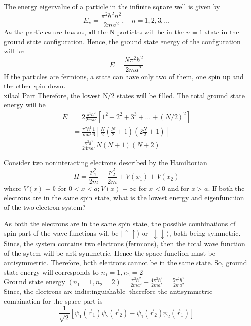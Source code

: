 \begin{answer}
	The energy eigenvalue of a particle in the infinite square well is given by
	$$
	E_{n}=\frac{\pi^{2} \hbar^{2} n^{2}}{2 m a^{2}}, \quad n=1,2,3, \ldots
	$$
	As the particles are bosons, all the $\mathrm{N}$ particles will be in the $n=1$ state in the ground state configuration. Hence, the ground state energy of the configuration will be
	$$
	E=\frac{N \pi^{2} \hbar^{2}}{2 m a^{2}}
	$$
	If the particles are fermions, a state can have only two of them, one spin up and the other spin down.\\
	xilaal Part Therefore, the lowest $\mathrm{N} / 2$ states will be filled. The total ground state energy will be
	$$
	\begin{aligned}
	E &=2 \frac{\pi^{2} \hbar^{2}}{2 m a^{2}}\left[1^{2}+2^{2}+3^{3}+\ldots+(N / 2)^{2}\right] \\
	&=\frac{\pi^{2} \hbar^{2}}{m a^{2}} \frac{1}{6}\left[\frac{N}{2}\left(\frac{N}{2}+1\right)\left(2 \frac{N}{2}+1\right)\right] \\
	&=\frac{\pi^{2} \hbar^{2}}{24 m a^{2}} N(N+1)(N+2)
	\end{aligned}
	$$
\end{answer}
\begin{exercise}
 Consider two noninteracting electrons described by the Hamiltonian
	$$
	H=\frac{p_{1}^{2}}{2 m}+\frac{p_{2}^{2}}{2 m}+V\left(x_{1}\right)+V\left(x_{2}\right)
	$$
	where $V(x)=0$ for $0<x<a ; V(x)=\infty$ for $x<0$ and for $x>a$. If both the electrons are in the same spin state, what is the lowest energy and eigenfunction of the two-electron system?
	\end{exercise}
\begin{answer}
	As both the electrons are in the same spin state, the possible combinations of spin part of the wave functions will be $|\uparrow \uparrow\rangle$ or $|\downarrow \downarrow\rangle$, both being symmetric. Since, the system contains two electrons (fermions), then the total wave function of the sytem will be anti-symmetric. Hence the space function must be antisymmetric. Therefore, both electrons cannot be in the same state. So, ground state energy will corresponds to $n_{1}=1, n_{2}=2$\\
	Ground state energy $\left(n_{1}=1, n_{2}=2\right)=\frac{\pi^{2} \hbar^{2}}{2 m a^{2}}+\frac{4 \pi^{2} \hbar^{2}}{2 m a^{2}}=\frac{5 \pi^{2} \hbar^{2}}{2 m a^{2}}$\\
	Since, the electrons are indistinguishable, therefore the antisymmetric combination for the space part is
	$$
	\frac{1}{\sqrt{2}}\left[\psi_{1}\left(\vec{r}_{1}\right) \psi_{2}\left(\vec{r}_{2}\right)-\psi_{1}\left(\vec{r}_{2}\right) \psi_{2}\left(\vec{r}_{1}\right)\right]
	$$
\end{answer}
